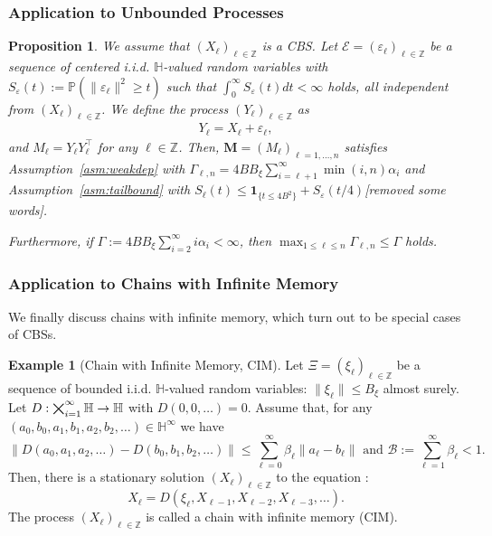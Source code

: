 \documentclass[11pt,a4paper]{article}
\newtheorem{proposition}[theorem]{Proposition}
\theoremstyle{remark}
\theoremstyle{definition}
\renewcommand{\Pr}{\mathbb{P}}
\theoremstyle{definition}
\newtheorem{example}{Example}
\renewcommand{\Pr}{\mathbb{P}}
\newcommand{\Surv}{S}
\newcommand{\rc}{\color{black}}
\begin{document}
\begin{bibunit}[apalike]
\subsubsection{Application to Unbounded Processes}

\begin{proposition}
\label{prop:assumptions}
We assume that $(X_\ell)_{\ell\in\mathbb{Z}}$ is a CBS. Let $\mathcal{E}=(\varepsilon_\ell)_{\ell\in\mathbb{Z}}$ be a sequence of centered i.i.d. $\mathbb{H}$-valued random variables with $\Surv_\varepsilon(t) := \Pr(\|\varepsilon_\ell\|^2 \geq t)$ {\rc such that $\int_{0}^{\infty}\Surv_{\varepsilon}(t)dt<\infty$ holds}, all independent from $(X_\ell)_{\ell\in\mathbb{Z}}$. 
We define the process $(Y_\ell)_{\ell\in\mathbb{Z}}$ as
\begin{align*}
    Y_{\ell}=X_{\ell}+\varepsilon_\ell,
\end{align*}
and $M_\ell =Y_\ell Y_{\ell}^\top $ for any $\ell\in\mathbb{Z}$.
Then, $\mathbf{M}=(M_\ell)_{\ell=1,\dots,n}$ satisfies Assumption~\ref{asm:weakdep} with $\Gamma_{\ell,n} = 4 B B_\xi \sum_{i=\ell+1}^\infty \min(i,n) \alpha_i $ and Assumption~\ref{asm:tailbound} with $\Surv_{\ell}(t) \leq  \mathbf{1}_{\{t\leq 4B^2\}} + \Surv_\varepsilon(t/4)${\rc[removed some words]}.

Furthermore, if $ \Gamma := 4 B B_\xi \sum_{i=2}^\infty i \alpha_i < \infty$, then $\max_{1 \leq \ell \leq n} \Gamma_{\ell,n} \leq \Gamma$ holds.
\end{proposition}

\subsubsection{Application to Chains with Infinite Memory}

We finally discuss chains with infinite memory, which turn out to be special cases of CBSs.
\begin{example}[Chain with Infinite Memory, CIM]
Let $\Xi = (\xi_\ell)_{\ell\in\mathbb{Z}}$ be a sequence of bounded i.i.d. $\mathbb{H}$-valued random variables: $\|\xi_\ell\| \leq B_\xi $ almost surely. Let $D:{\rc\bigtimes_{i=1}^{\infty}\mathbb{H}} \rightarrow \mathbb{H}$ with $D(0,0,\dots)=0$. Assume that, for any $(a_0,b_0,a_1,b_1,a_2,b_2,\dots)\in \mathbb{H}^{\infty}$ we have
$$ \| D(a_0,a_1,a_2,\dots) - D(b_0,b_1,b_2,\dots) \| \leq   \sum_{\ell=0}^{\infty} \beta_\ell \|a_\ell-b_\ell \| \text{ and } \mathcal{B} := \sum_{\ell=1}^{\infty} \beta_\ell < 1. $$
Then, there is a stationary solution $(X_\ell)_{\ell\in\mathbb{Z}}$ to the equation \citep{doukhan2008weakly}:
$$ X_\ell = D(\xi_{\ell},X_{\ell-1},X_{\ell-2},X_{\ell-3},\dots). $$
The process $(X_\ell)_{\ell\in\mathbb{Z}}$ is called a chain with infinite memory (CIM). 
\end{example}


\end{bibunit}
\end{document}
